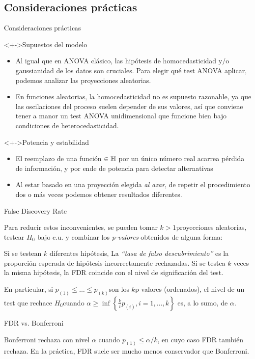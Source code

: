 \documentclass[10pt,spanish]{beamer}\usepackage[]{graphicx}\usepackage[]{color}
\begin{document}
\subsection{Consideraciones prácticas}
\begin{frame}{Consideraciones prácticas}
\begin{alertblock}<+->{Supuestos del modelo}
\begin{itemize}[<+->]
\item Al igual que en ANOVA clásico, las hipótesis de homocedasticidad
y/o gaussianidad de los datos son cruciales. Para elegir qué test
ANOVA aplicar, podemos analizar las proyecciones aleatorias. 
\item En funciones aleatorias, la homocedasticidad no es supuesto razonable,
ya que las oscilaciones del proceso suelen depender de sus valores,
así que conviene tener a manor un test ANOVA unidimensional que funcione
bien bajo condiciones de heterocedasticidad.
\end{itemize}
\end{alertblock}

\pause{}
\begin{alertblock}<+->{Potencia y estabilidad}
\begin{itemize}[<+->]
\item El reemplazo de una función $\in\mathbb{H}$ por un único número real acarrea
pérdida de información, y por ende de potencia para detectar alternativas
\item Al estar basado en una proyección elegida \emph{al azar}, de repetir
el procedimiento dos o más veces podemos obtener resultados diferentes.
\end{itemize}
\end{alertblock}
\end{frame}
%
\begin{frame}{False Discovery Rate}

Para reducir estos inconvenientes, se pueden tomar $k>1$proyecciones
aleatorias, testear $H_{0}$ bajo c.u. y combinar los \emph{p-valores}
obtenidos de alguna forma:  

\pause{}

Si se testean $k$ diferentes hipótesis, La \emph{“tasa de falso
descubrimiento”} es la proporción esperada de hipótesis incorrectamente
rechazadas. Si se testea $k$ veces la misma hipótesis, la FDR coincide
con el nivel de significación del test. 

\pause{}

En particular, si $p_{\left(1\right)}\leq\dots\leq p_{\left(k\right)}$son
los $k$p-valores (ordenados), el nivel de un test que rechace $H_{0}$cuando
$\alpha\geq\inf\left\{ \frac{k}{i}p_{\left(i\right)},i=1,\dots,k\right\} $
es, a lo sumo, de $\alpha$.

\pause{}
\begin{alertblock}{FDR vs. Bonferroni}

Bonferroni rechaza con nivel $\alpha$ cuando $p_{\left(1\right)}\leq$$\alpha/k$,
en cuyo caso FDR también rechaza. En la práctica, FDR suele ser mucho
menos conservador que Bonferroni.
\end{alertblock}
\end{frame}
\end{document}
